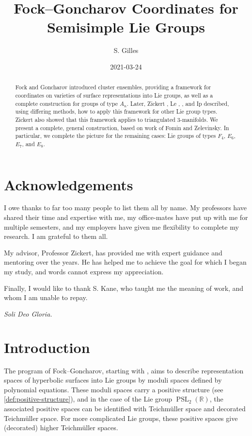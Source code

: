 \documentclass{amsart}
\author{S. Gilles}
\title{Fock--Goncharov Coordinates for Semisimple Lie Groups}
\date{2021-03-24}
\theoremstyle{plain}
\theoremstyle{definition}
\theoremstyle{remark}
\DeclareMathOperator{\PSL}{PSL}
\begin{document}
  \begin{abstract}
    Fock and Goncharov \cite{fockgoncharov2006} introduced cluster
    ensembles, providing a framework for coordinates on varieties of
    surface representations into Lie groups, as well as a complete
    construction for groups of type $A_n$. Later, Zickert
    \cite{zickert2016}, Le \cite{le2016}, \cite{le2016_2}, and Ip
    \cite{ip2016} described, using differing methods, how to apply this
    framework for other Lie group types. Zickert also showed that this
    framework applies to triangulated $3$-manifolds. We present a
    complete, general construction, based on work of Fomin and
    Zelevinsky. In particular, we complete the picture for the remaining
    cases: Lie groups of types $F_4$, $E_6$, $E_7$, and $E_8$.
  \end{abstract}

  \maketitle

  \tableofcontents

  \section*{Acknowledgements}

  I owe thanks to far too many people to list them all by name. My
  professors have shared their time and expertise with me, my
  office-mates have put up with me for multiple semesters, and my
  employers have given me flexibility to complete my research. I am
  grateful to them all.

  My advisor, Professor Zickert, has provided me with expert guidance
  and mentoring over the years. He has helped me to achieve the goal for
  which I began my study, and words cannot express my appreciation.

  Finally, I would like to thank S. Kane, who taught me the meaning of
  work, and whom I am unable to repay.

  \emph{Soli Deo Gloria.}

  \section{Introduction}

  The program of Fock--Goncharov, starting with
  \cite{fockgoncharov2006}, aims to describe representation spaces of
  hyperbolic surfaces into Lie groups by moduli spaces defined by
  polynomial equations. These moduli spaces carry a positive structure
  (see \cref{def:positive-structure}), and in the case of the Lie group
  $\PSL_2(\mathbb{R})$, the associated positive spaces can be identified
  with Teichmüller space and decorated Teichmüller space. For more
  complicated Lie groups, these positive spaces give (decorated) higher
  Teichmüller spaces.
\end{document}
